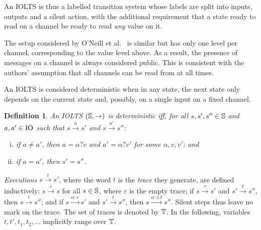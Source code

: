 \documentclass[preprint,5p,twocolumn]{elsarticle}
\newtheorem{definition}[theorem]{Definition}
\begin{document}
An IOLTS is thus a labelled transition system whose labels are split into
inputs, outputs and a silent action, with the additional requirement that a state ready to
read on a channel be ready to read \emph{any} value on it. %

The setup considered by O'Neill et al.~\cite{ONeill2006} is similar but has only one level
per channel, corresponding to the value level above. As a result, the presence of messages on a
channel is always considered public. This is consistent with the authors' assumption that
all channels can be read from at all times.

An IOLTS is considered deterministic when in any state, the next state only depends on the
current state and, possibly, on a single input on a fixed channel.

\begin{definition}
  \label{def:deterministic}
  An IOLTS $(\mathbb{S}, \rightarrow)$ is deterministic iff, for all $s,s',s'' \in \mathbb{S}$ and
  $a,a' \in \mathrm{IO}$ such that $s \xrightarrow{a} s'$ and $s \xrightarrow{a'} s''$:
  \begin{enumerate}[(i)]
  \item if $a \neq a'$, then $a = \alpha ? v$ and $a' = \alpha ? v'$ for some $\alpha,v,v'$; and
  \item if $a = a'$, then $s' = s''$.
  \end{enumerate}
\end{definition}

\emph{Executions} $s \xrightarrow{t} s'$, where the word $t$ is the \emph{trace} they generate,
are defined inductively: $s \xrightarrow{\varepsilon} s$ for all $s \in \mathbb{S}$, where
$\varepsilon$ is the empty trace; if $s \xrightarrow{\tau} s'$ and $s' \xrightarrow{t} s''$, then
$s \xrightarrow{t} s''$; and if $s \xrightarrow{\alpha : v} s'$ and $s' \xrightarrow{t} s''$, then
$s \xrightarrow{\alpha : v . t} s''$. Silent steps thus leave no mark on the trace.
The set of traces is denoted by $\mathbb{T}$.
In the following, variables $t, t', t_1, t_2, \dots$ implicitly range over $\mathbb{T}$.
\end{document}
